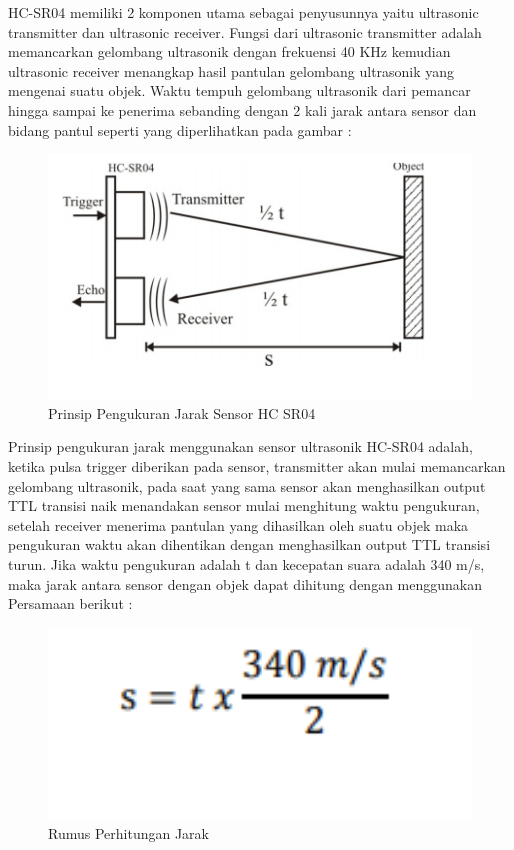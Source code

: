 \begin{enumerate}
\par HC-SR04 memiliki 2 komponen utama sebagai penyusunnya yaitu ultrasonic transmitter dan ultrasonic receiver. Fungsi dari ultrasonic transmitter adalah memancarkan gelombang ultrasonik dengan frekuensi 40 KHz kemudian ultrasonic receiver menangkap hasil pantulan gelombang ultrasonik yang mengenai suatu objek. Waktu tempuh gelombang ultrasonik dari pemancar hingga sampai ke penerima sebanding dengan 2 kali jarak antara sensor dan bidang
pantul seperti yang diperlihatkan pada gambar :
\begin{figure}[H]
\centering
\includegraphics[width=1\textwidth]{figures/sr04.png}
\caption{Prinsip Pengukuran Jarak Sensor HC SR04}
\label{print}
\end{figure}
Prinsip pengukuran jarak menggunakan sensor ultrasonik HC-SR04 adalah, ketika pulsa trigger diberikan pada sensor, transmitter akan mulai memancarkan gelombang ultrasonik, pada saat yang sama sensor akan menghasilkan output TTL transisi naik menandakan sensor mulai menghitung waktu pengukuran, setelah receiver menerima pantulan yang dihasilkan oleh suatu objek maka pengukuran waktu akan dihentikan dengan menghasilkan output TTL transisi turun. Jika waktu pengukuran adalah t dan kecepatan suara adalah 340 m/s, maka jarak antara sensor dengan objek dapat dihitung dengan menggunakan Persamaan berikut :
\begin{figure}[H]
\centering
\includegraphics[width=1\textwidth]{figures/rumus2.png}
\caption{Rumus Perhitungan Jarak}
\label{print}
\end{figure}


\end{enumerate}
